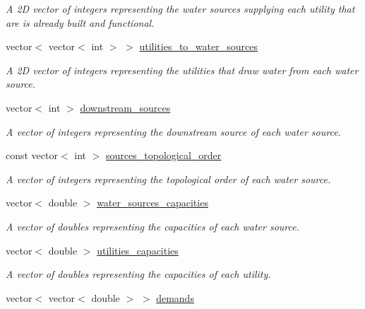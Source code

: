 \begin{DoxyCompactItemize}
\begin{DoxyCompactList}\small\item\em A 2D vector of integers representing the water sources supplying each utility that are is already built and functional. \end{DoxyCompactList}\item 
vector$<$ vector$<$ int $>$ $>$ \mbox{\hyperlink{classContinuityModel_a5cf4be0afa886eb09a3e143f54c29044}{utilities\+\_\+to\+\_\+water\+\_\+sources}}
\begin{DoxyCompactList}\small\item\em A 2D vector of integers representing the utilities that draw water from each water source. \end{DoxyCompactList}\item 
vector$<$ int $>$ \mbox{\hyperlink{classContinuityModel_af00ea62ac8e2e398591ff608c2a203ef}{downstream\+\_\+sources}}
\begin{DoxyCompactList}\small\item\em A vector of integers representing the downstream source of each water source. \end{DoxyCompactList}\item 
const vector$<$ int $>$ \mbox{\hyperlink{classContinuityModel_a6605cb6aae0370eb84d2e8bf7d6d651e}{sources\+\_\+topological\+\_\+order}}
\begin{DoxyCompactList}\small\item\em A vector of integers representing the topological order of each water source. \end{DoxyCompactList}\item 
vector$<$ double $>$ \mbox{\hyperlink{classContinuityModel_aadc8d46b2d0cc0a5c6b5ccdf0c5c24d4}{water\+\_\+sources\+\_\+capacities}}
\begin{DoxyCompactList}\small\item\em A vector of doubles representing the capacities of each water source. \end{DoxyCompactList}\item 
vector$<$ double $>$ \mbox{\hyperlink{classContinuityModel_a781786effdf14fefcb2201eb33d9e0c7}{utilities\+\_\+capacities}}
\begin{DoxyCompactList}\small\item\em A vector of doubles representing the capacities of each utility. \end{DoxyCompactList}\item 
vector$<$ vector$<$ double $>$ $>$ \mbox{\hyperlink{classContinuityModel_a1994ed4d99e0583eac5c82a4b26d9728}{demands}}

\end{DoxyCompactItemize}
